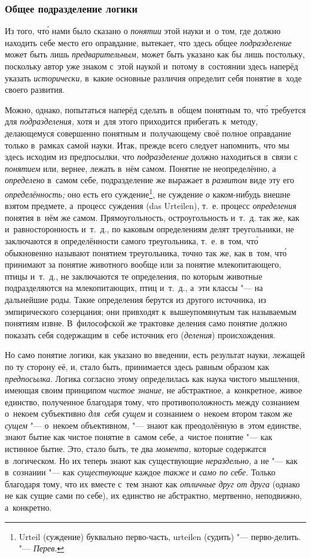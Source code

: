 \subsubsection{Общее подразделение логики}
Из того, чт\'{о} нами было сказано о
{\em понятии} этой науки и~о том, где должно находить
себе место его оправдание, вытекает, что здесь общее
{\em подразделение} может быть лишь
{\em предварительным,} может быть указано как бы лишь
постольку, поскольку автор уже знаком с~этой наукой и~потому в~состоянии
здесь наперёд указать {\em исторически,} в~какие
основные различия определит себя понятие в~ходе своего развития.

Можно, однако, попытаться наперёд сделать в~общем понятным то, чт\'{о} требуется
для {\em подразделения,} хотя и~для этого приходится
прибегать к~методу, делающемуся совершенно понятным и~получающему своё
полное оправдание только в~рамках самой науки. Итак, прежде всего следует
напомнить, что мы здесь исходим из предпосылки, что
{\em подразделение} должно находиться в~связи с
{\em понятием} или, вернее, лежать в~нём самом. Понятие
не неопределённо, а {\em определено} в~самом себе,
подразделение же выражает в {\em развитом} виде эту его
{\em определённость;} оно есть его суждение\footnote{
Urteil (суждение) буквально перво-часть, urteilen (судить) "--- перво-делить.
"--- {\em Перев}.}, не суждение {\em о} каком-нибудь
внешне взятом предмете, а~процесс суждения (das Urteilen), т.~е. процесс
{\em определения} понятия в~нём же самом.
Прямоугольность, остроугольность и~т.~д. так же, как и~равносторонность
и~т.~д., по каковым определениям делят треугольники, не заключаются в
определённости самого треугольника, т.~е. в~том, чт\'{о} обыкновенно называют
понятием треугольника, точно так же, как в~том, чт\'{о} принимают за понятие
животного вообще или за понятие млекопитающего, птицы и~т.~д., не
заключаются те определения, по которым животные подразделяются на
млекопитающих, птиц и~т.~д., а~эти классы "--- на дальнейшие роды. Такие
определения берутся из другого источника, из эмпирического созерцания; они
привходят к~вышеупомянутым так называемым понятиям извне. В~философской же
трактовке деления само понятие должно показать себя содержащим в~себе
источник его ({\em деления}) происхождения.

Но само понятие логики, как указано во введении, есть результат науки,
лежащей по ту сторону её, и, стало быть, принимается здесь равным образом
как {\em предпосылка}. Логика согласно этому
определилась как наука чистого мышления, имеющая своим принципом
{\em чистое знание,} не абстрактное, а~конкретное,
живое единство, полученное благодаря тому, что
противоположность между сознанием о~некоем субъективно {\em для~себя сущем}
и сознанием о~некоем втором таком же {\em сущем} "--- о~некоем
объективном, "--- знают как преодолённую в~этом единстве, знают бытие как
чистое понятие в~самом себе, а~чистое понятие "--- как истинное бытие.
Это, стало быть, те два
{\em момента,} которые содержатся в~логическом. Но их теперь знают как
существующие {\em нераздельно,} а
не "--- как в~сознании "--- как {\em существующие} каждое {\em также} и
{\em само по себе}. Только благодаря тому, что их вместе с~тем знают как
{\em отличные друг от друга} (однако не как сущие сами по
себе), их единство не абстрактно, мертвенно, неподвижно, а~конкретно.

